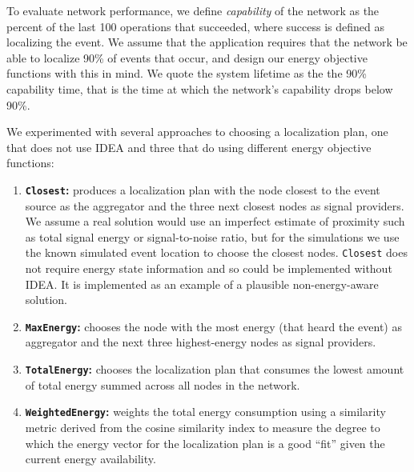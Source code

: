 To evaluate network performance, we define \textit{capability} of the network
as the percent of the last 100 operations that succeeded, where success is
defined as localizing the event. We assume that the application requires that
the network be able to localize 90\% of events that occur, and design our
energy objective functions with this in mind. We quote the system lifetime as
the the 90\% capability time, that is the time at which the network's
capability drops below 90\%.

We experimented with several approaches to choosing a localization plan, one
that does not use IDEA and three that do using different energy objective
functions:

\begin{enumerate}

\item \textbf{\texttt{Closest}:} produces a localization plan with the node
closest to the event source as the aggregator and the three next closest
nodes as signal providers. We assume a real solution would use an imperfect
estimate of proximity such as total signal energy or signal-to-noise ratio,
but for the simulations we use the known simulated event location to choose
the closest nodes. \texttt{Closest} does not require energy state information
and so could be implemented without IDEA. It is implemented as an example of
a plausible non-energy-aware solution.

\item \textbf{\texttt{MaxEnergy}:} chooses the node with the most energy
(that heard the event) as aggregator and the next three highest-energy nodes
as signal providers.

\item \textbf{\texttt{TotalEnergy}:} chooses the localization plan that
consumes the lowest amount of total energy summed across all nodes in the
network.

\item \textbf{\texttt{WeightedEnergy}:} weights the total energy consumption
using a similarity metric derived from the cosine similarity index to measure
the degree to which the energy vector for the localization plan is a good
``fit'' given the current energy availability.

\end{enumerate}

